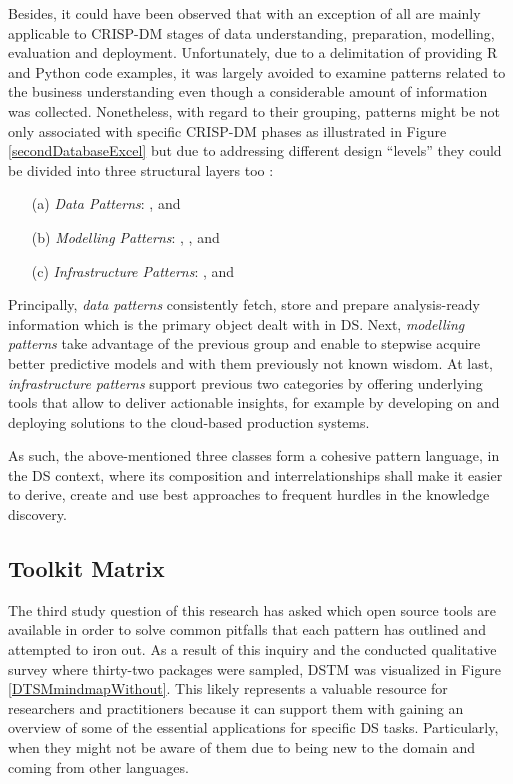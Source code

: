 Besides, it could have been observed that with an exception of  all are mainly applicable to \ac{CRISP-DM} stages of data understanding, preparation, modelling, evaluation and deployment. 
Unfortunately, due to a delimitation of providing R and Python code examples, it was largely avoided to examine patterns related to the business understanding even though a considerable amount of information was collected.
Nonetheless, with regard to their grouping, patterns might be not only associated with specific \ac{CRISP-DM} phases as illustrated in Figure \ref{secondDatabaseExcel} but due to addressing different design \enquote{levels} they could be divided into three structural layers too \parencites{DeardenHCI2006}{ChenHong2004}:
%
\begin{enumerate}
	\item [(a)] \emph{Data Patterns}: ,  and 
	\item [(b)] \emph{Modelling Patterns}: , ,  and 
	\item [(c)] \emph{Infrastructure Patterns}: ,  and 
\end{enumerate}

Principally, \emph{data patterns} consistently fetch, store and prepare analysis-ready information which is the primary object dealt with in \ac{DS}. 
Next, \emph{modelling patterns} take advantage of the previous group and enable to stepwise acquire better predictive models and with them previously not known wisdom.
At last, \emph{infrastructure patterns} support previous two categories by offering underlying tools that allow to deliver actionable insights, for example by developing on and deploying solutions to the cloud-based production systems.

As such, the above-mentioned three classes form a cohesive pattern language, in the \ac{DS} context, where its composition and interrelationships shall make it easier to derive, create and use best approaches to frequent hurdles in the knowledge discovery.

\subsection{Toolkit Matrix}
The third study question of this research has asked which open source tools are available in order to solve common pitfalls that each pattern has outlined and attempted to iron out. 
As a result of this inquiry and the conducted qualitative survey where thirty-two packages were sampled, \acl{DSTM} was visualized in Figure \ref{DTSMmindmapWithout}. 
This likely represents a valuable resource for researchers and practitioners because it can support them with gaining an overview of some of the essential applications for specific \ac{DS} tasks.
Particularly, when they might not be aware of them due to being new to the domain and coming from other languages.

